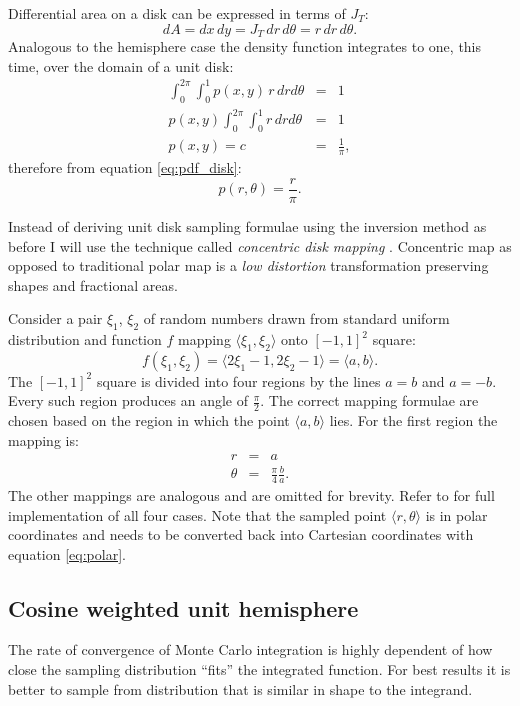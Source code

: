 Differential area on a disk can be expressed in terms of $J_{T}$:
\begin{equation}
  dA = dx\,dy = J_{T}\,dr\,d\theta = r\,dr\,d\theta.
\end{equation}
Analogous to the hemisphere case the density function integrates to one, this time, over the domain of a unit disk:
\begin{eqnarray}
  \int_{0}^{2\pi} \int_{0}^{1} p(x,y) \,r \,dr d\theta &=& 1 \nonumber \\
  p(x,y) \int_{0}^{2\pi} \int_{0}^{1} r \,dr d\theta &=& 1 \nonumber \\
  p(x,y) = c &=& \frac{1}{\pi},
\end{eqnarray}
therefore from equation \ref{eq:pdf_disk}:
\begin{equation}
  p(r, \theta) = \frac{r}{\pi}.
\end{equation}

Instead of deriving unit disk sampling formulae using the inversion method as before I will use the technique called \emph{concentric disk mapping} \parencite{shirley97}. Concentric map as opposed to traditional polar map is a \emph{low distortion} transformation preserving shapes and fractional areas.

Consider a pair $\xi_{1}$, $\xi_{2}$ of random numbers drawn from standard uniform distribution and function $f$ mapping $\langle \xi_{1}, \xi_{2} \rangle$ onto $[-1,1]^{2}$ square:
\begin{equation}
  f(\xi_{1}, \xi_{2}) = \langle 2\xi_{1} - 1, 2\xi_{2} - 1 \rangle = \langle a, b \rangle.
\end{equation}
The $[-1,1]^{2}$ square is divided into four regions by the lines $a=b$ and $a=-b$. Every such region produces an angle of $\frac{\pi}{2}$. The correct mapping formulae are chosen based on the region in which the point $\langle a, b \rangle$ lies. For the first region the mapping is:
\begin{eqnarray}
  r &=& a \nonumber \\
  \theta &=& \frac{\pi}{4} \frac{b}{a}.
\end{eqnarray}
The other mappings are analogous and are omitted for brevity. Refer to \cite{shirley97} for full implementation of all four cases. Note that the sampled point $\langle r, \theta \rangle$ is in polar coordinates and needs to be converted back into Cartesian coordinates with equation \ref{eq:polar}.

\subsection{Cosine weighted unit hemisphere}
The rate of convergence of Monte Carlo integration is highly dependent of how close the sampling distribution ``fits'' the integrated function. For best results it is better to sample from distribution that is similar in shape to the integrand.

